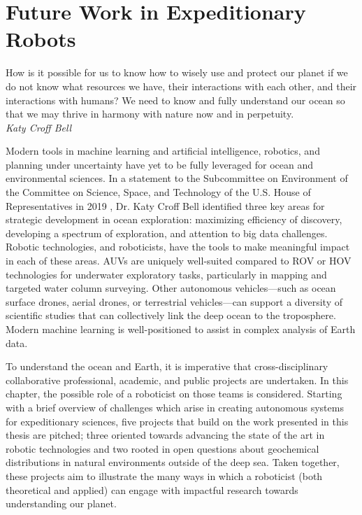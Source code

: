 \chapter{Future Work in Expeditionary Robots}
\label{chap:future}

\begin{center}
    \begin{minipage}{0.7\textwidth}
      \begin{small}
        How is it possible for us to know how to wisely use and protect our planet if we do not know
        what resources we have, their interactions with each other, and their interactions with humans? We need to know and fully understand our ocean so that we may thrive in harmony with nature now and in perpetuity.\\ \emph{Katy Croff Bell}
      \end{small}
    \end{minipage}
    \vspace{0.5cm}
\end{center}



Modern tools in machine learning and artificial intelligence, robotics, and planning under uncertainty have yet to be fully leveraged for ocean and environmental sciences.
In a statement to the Subcommittee on Environment of the Committee on Science, Space, and Technology of the U.S. House of Representatives in 2019 \autocite{bell2019envisioning}, Dr. Katy Croff Bell identified three key areas for strategic development in ocean exploration: maximizing efficiency of discovery, developing a spectrum of exploration, and attention to big data challenges.
Robotic technologies, and roboticists, have the tools to make meaningful impact in each of these areas.
AUVs are uniquely well-suited compared to ROV or HOV technologies for underwater exploratory tasks, particularly in mapping and targeted water column surveying.
Other autonomous vehicles---such as ocean surface drones, aerial drones, or terrestrial vehicles---can support a diversity of scientific studies that can collectively link the deep ocean to the troposphere.
Modern machine learning is well-positioned to assist in complex analysis of Earth data.

To understand the ocean and Earth, it is imperative that cross-disciplinary collaborative professional, academic, and public projects are undertaken. In this chapter, the possible role of a roboticist on those teams is considered. Starting with a brief overview of challenges which arise in creating autonomous systems for expeditionary sciences, five projects that build on the work presented in this thesis are pitched; three oriented towards advancing the state of the art in robotic technologies and two rooted in open questions about geochemical distributions in natural environments outside of the deep sea. Taken together, these projects aim to illustrate the many ways in which a roboticist (both theoretical and applied) can engage with impactful research towards understanding our planet.

